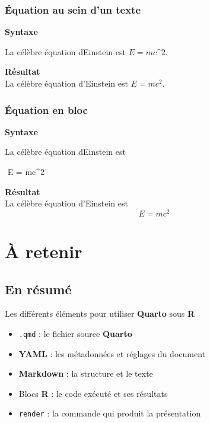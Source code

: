 \documentclass[
  french,
  10pt,
  a4paper,
]{article}
\newenvironment{Shaded}{}{}
\newcommand{\NormalTok}[1]{\textcolor[rgb]{0.22,0.23,0.26}{#1}}
\providecommand{\tightlist}{%
  \setlength{\itemsep}{0pt}\setlength{\parskip}{0pt}}
\begin{document}
\subsubsection{Équation au sein d'un
texte}\label{uxe9quation-au-sein-dun-texte}

\textbf{Syntaxe}

\begin{Shaded}
\begin{Highlighting}[]
\NormalTok{La célèbre équation d\textquotesingle{}Einstein est $E = mc\^{}2$.}
\end{Highlighting}
\end{Shaded}

\textbf{Résultat}\\
La célèbre équation d'Einstein est \(E = mc^2\).

\subsubsection{Équation en bloc}\label{uxe9quation-en-bloc}

\textbf{Syntaxe}

\begin{Shaded}
\begin{Highlighting}[]
\NormalTok{La célèbre équation d\textquotesingle{}Einstein est }

\NormalTok{$$}
\NormalTok{E = mc\^{}2}
\NormalTok{$$}
\end{Highlighting}
\end{Shaded}

\textbf{Résultat}\\
La célèbre équation d'Einstein est\\
\[
E = mc^2
\]

\section{À retenir}\label{uxe0-retenir}

\subsection{En résumé}\label{en-ruxe9sumuxe9}

Les différents éléments pour utiliser \textbf{Quarto} sous \textbf{R}

\begin{itemize}
\tightlist
\item
  \texttt{.qmd} : le fichier source \textbf{Quarto}\\
\item
  \textbf{YAML} : les métadonnées et réglages du document\\
\item
  \textbf{Markdown} : la structure et le texte\\
\item
  Blocs \textbf{R} : le code exécuté et ses résultats\\
\item
  \texttt{render} : la commande qui produit la présentation
\end{itemize}
\end{document}
